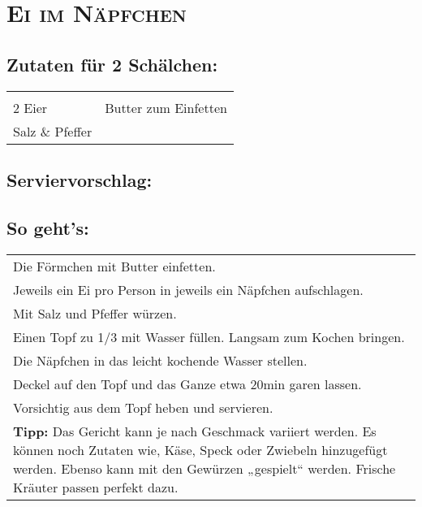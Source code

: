 \section{\textsc{Ei im Näpfchen}}

\subsection*{Zutaten für 2 Schälchen:}

\begin{tabular}{p{7.5cm} p{7.5cm}}
	& \\
	2 Eier & Butter zum Einfetten \\
	Salz \& Pfeffer &
\end{tabular}

\subsection*{Serviervorschlag:}


\subsection*{So geht's:}

\begin{tabular}{p{15cm}}
	\\
  Die Förmchen mit Butter einfetten.\\
  Jeweils ein Ei pro Person in jeweils ein Näpfchen aufschlagen. \\
  Mit Salz und Pfeffer würzen.\\
  Einen Topf zu 1/3 mit Wasser füllen. Langsam zum Kochen bringen.\\
  Die Näpfchen in das leicht kochende Wasser stellen.\\
  Deckel auf den Topf und das Ganze etwa 20min garen lassen.\\
  Vorsichtig aus dem Topf heben und servieren.\\
  \vspace{0.5cm}
  \textbf{Tipp:} Das Gericht kann je nach Geschmack variiert werden. Es können noch Zutaten wie, Käse, Speck oder Zwiebeln hinzugefügt werden. Ebenso kann mit den Gewürzen „gespielt“ werden. Frische Kräuter passen perfekt dazu.
\end{tabular}
